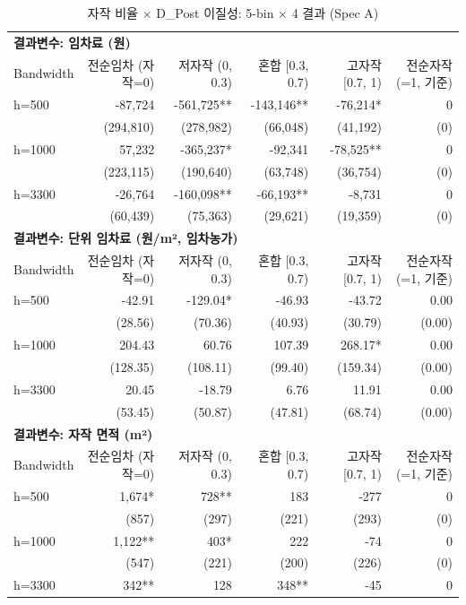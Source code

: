 \begin{table}[t]
\centering
\caption{자작 비율 × D\_Post 이질성: 5-bin × 4 결과 (Spec A)}
\label{tab:het_own_share_ko}
\begin{tabular}{lrrrrr}
\toprule
\multicolumn{6}{l}{\textbf{결과변수: 임차료 (원)}} \\
Bandwidth & 전순임차 (자작=0) & 저자작 (0, 0.3) & 혼합 [0.3, 0.7) & 고자작 [0.7, 1) & 전순자작 (=1, 기준) \\
\midrule
h=500 & -87,724 & -561,725** & -143,146** & -76,214* & 0 \\
    & (294,810) & (278,982) & (66,048) & (41,192) & (0) \\
h=1000 & 57,232 & -365,237* & -92,341 & -78,525** & 0 \\
    & (223,115) & (190,640) & (63,748) & (36,754) & (0) \\
h=3300 & -26,764 & -160,098** & -66,193** & -8,731 & 0 \\
    & (60,439) & (75,363) & (29,621) & (19,359) & (0) \\
\midrule
\multicolumn{6}{l}{\textbf{결과변수: 단위 임차료 (원/m², 임차농가)}} \\
Bandwidth & 전순임차 (자작=0) & 저자작 (0, 0.3) & 혼합 [0.3, 0.7) & 고자작 [0.7, 1) & 전순자작 (=1, 기준) \\
\midrule
h=500 & -42.91 & -129.04* & -46.93 & -43.72 & 0.00 \\
    & (28.56) & (70.36) & (40.93) & (30.79) & (0.00) \\
h=1000 & 204.43 & 60.76 & 107.39 & 268.17* & 0.00 \\
    & (128.35) & (108.11) & (99.40) & (159.34) & (0.00) \\
h=3300 & 20.45 & -18.79 & 6.76 & 11.91 & 0.00 \\
    & (53.45) & (50.87) & (47.81) & (68.74) & (0.00) \\
\midrule
\multicolumn{6}{l}{\textbf{결과변수: 자작 면적 (m²)}} \\
Bandwidth & 전순임차 (자작=0) & 저자작 (0, 0.3) & 혼합 [0.3, 0.7) & 고자작 [0.7, 1) & 전순자작 (=1, 기준) \\
\midrule
h=500 & 1,674* & 728** & 183 & -277 & 0 \\
    & (857) & (297) & (221) & (293) & (0) \\
h=1000 & 1,122** & 403* & 222 & -74 & 0 \\
    & (547) & (221) & (200) & (226) & (0) \\
h=3300 & 342** & 128 & 348** & -45 & 0 \\

\end{tabular}
\end{table}
